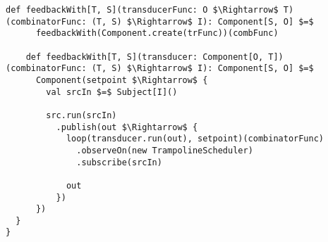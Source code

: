 \begin{lstlisting}[style=ScalaStyle, caption={Operators on \comp}, label={lst:component-operators}]
    def feedbackWith[T, S](transducerFunc: O $\Rightarrow$ T)(combinatorFunc: (T, S) $\Rightarrow$ I): Component[S, O] $=$
      feedbackWith(Component.create(trFunc))(combFunc)

    def feedbackWith[T, S](transducer: Component[O, T])(combinatorFunc: (T, S) $\Rightarrow$ I): Component[S, O] $=$
      Component(setpoint $\Rightarrow$ {
        val srcIn $=$ Subject[I]()

        src.run(srcIn)
          .publish(out $\Rightarrow$ {
            loop(transducer.run(out), setpoint)(combinatorFunc)
              .observeOn(new TrampolineScheduler)
              .subscribe(srcIn)

            out
          })
      })
  }
}
\end{lstlisting}